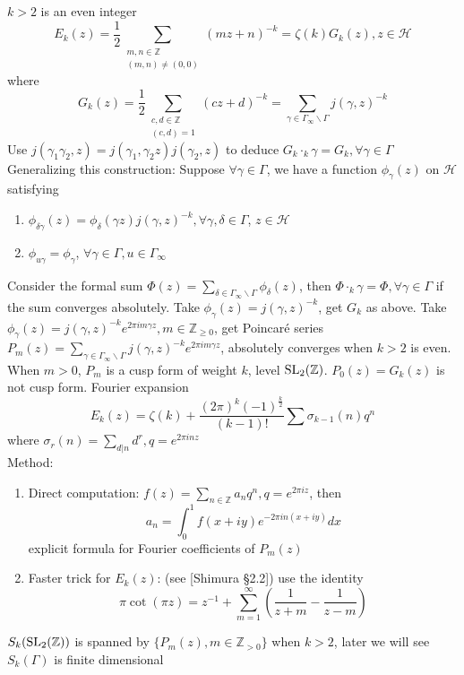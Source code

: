 \documentclass[main]{subfiles}
\begin{document}
\begin{definition}
$k>2$ is an even integer
\[E_k(z)=\frac{1}{2}\sum_{\substack{m,n\in\mathbb Z \\ (m,n)\neq(0,0)}}(mz+n)^{-k}=\zeta(k)G_k(z),z\in\mathcal H\]
where
\[G_k(z)=\frac{1}{2}\sum_{\substack{c,d\in\mathbb Z \\ (c,d)=1}}(cz+d)^{-k}=\sum_{\gamma\in\Gamma_\infty\backslash\Gamma}j(\gamma,z)^{-k}\]
Use $j(\gamma_1\gamma_2,z)=j(\gamma_1,\gamma_2z)j(\gamma_2,z)$ to deduce $G_k\cdot_k\gamma=G_k,\forall\gamma\in\Gamma$ \\
Generalizing this construction: Suppose $\forall\gamma\in\Gamma$, we have a function $\phi_\gamma(z)$ on $\mathcal H$ satisfying
\begin{enumerate}
\item $\phi_{\delta\gamma}(z)=\phi_\delta(\gamma z)j(\gamma,z)^{-k},\forall\gamma,\delta\in\Gamma$, $z\in\mathcal H$
\item $\phi_{u\gamma}=\phi_\gamma$, $\forall \gamma\in\Gamma,u\in\Gamma_\infty$
\end{enumerate}
Consider the formal sum $\Phi(z)=\sum_{\delta\in\Gamma_\infty\backslash\Gamma}\phi_\delta(z)$, then $\Phi\cdot_k\gamma=\Phi,\forall\gamma\in\Gamma$ if the sum converges absolutely. Take $\phi_\gamma(z)=j(\gamma,z)^{-k}$, get $G_k$ as above. Take $\phi_\gamma(z)=j(\gamma,z)^{-k}e^{2\pi im\gamma z},m\in\mathbb Z_{\geq0}$, get Poincar\'e series $P_m(z)=\sum_{\gamma\in\Gamma_\infty\backslash\Gamma}j(\gamma,z)^{-k}e^{2\pi im\gamma z}$, absolutely converges when $k>2$ is even. When $m>0$, $P_m$ is a cusp form of weight $k$, level $\operatorname{SL}_2(\mathbb Z)$. $P_0(z)=G_k(z)$ is not cusp form. Fourier expansion
\[E_k(z)=\zeta(k)+\frac{(2\pi)^k(-1)^{\frac{k}{2}}}{(k-1)!}\sum\sigma_{k-1}(n)q^n\]
where $\sigma_r(n)=\sum_{d|n}d^r,q=e^{2\pi inz}$ \\
Method:
\begin{enumerate}
\item Direct computation: $f(z)=\sum_{n\in\mathbb Z}a_nq^n,q=e^{2\pi iz}$, then \[a_n=\int_0^1f(x+iy)e^{-2\pi in(x+iy)}dx\] explicit formula for Fourier coefficients of $P_m(z)$
\item Faster trick for $E_k(z)$: (see [Shimura \S2.2]) use the identity \[\pi\cot(\pi z)=z^{-1}+\sum_{m=1}^\infty\left(\frac{1}{z+m}-\frac{1}{z-m}\right)\]
\end{enumerate}
\end{definition}

\begin{fact}
$S_k(\operatorname{SL}_2(\mathbb Z))$ is spanned by $\{P_m(z),m\in\mathbb Z_{>0}\}$ when $k>2$, later we will see $S_k(\Gamma)$ is finite dimensional
\end{fact}
\end{document}
